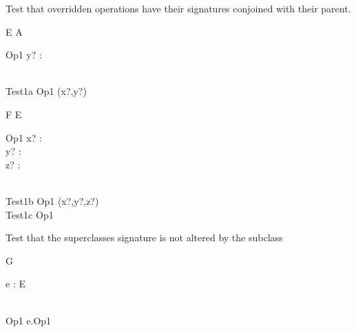 Test that overridden operations have their signatures conjoined with
their parent.
\begin{class}{E}
  A\\
  \begin{op}{Op1}
    y? : \power\nat
  \end{op}\\
  Test1a \sdef Op1 \hide (x?,y?)
\end{class}

\begin{class}{F}
  E\\
  \begin{op}{Op1}
    x? : \nat\\
    y? : \power \nat\\
    z? : \power\power \nat
  \end{op}\\
  Test1b \sdef Op1 \hide (x?,y?,z?)\\
  Test1c \sdef Op1 
\end{class}

Test that the superclasses signature is not altered by the subclass
\begin{class}{G}
  \begin{state}
    e : E
  \end{state}\\
  Op1 \sdef e.Op1 \land [z? : \nat]
\end{class}
